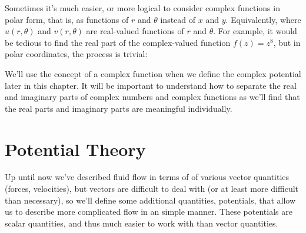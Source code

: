 \documentclass[12pt]{book}
\begin{document}
Sometimes it's much easier, or more logical to consider complex functions in polar form, that is, as functions of $r$ and $\theta$ instead of $x$ and $y$.  Equivalently, 
where $u(r, \theta)$ and $v(r, \theta)$ are real-valued functions of $r$ and $\theta$.  For example, it would be tedious to find the real part of the complex-valued function $f(z) = z^8$, but in polar coordinates, the process is trivial:












We'll use the concept of a complex function when we define the complex potential later in this chapter.  It will be important to understand how to separate the real and imaginary parts of complex numbers and complex functions as we'll find that the real parts and imaginary parts are meaningful individually.

\section{Potential Theory}
Up until now we've described fluid flow in terms of of various vector quantities (forces, velocities), but vectors are difficult to deal with (or at least more difficult than necessary), so we'll define some additional quantities, potentials, that allow us to describe more complicated flow in an simple manner.  These potentials are scalar quantities, and thus much easier to work with than vector quantities.
\end{document}
